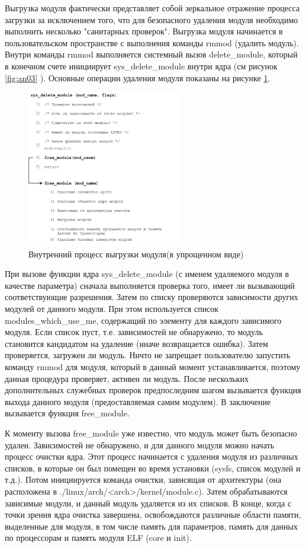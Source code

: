 Выгрузка модуля фактически представляет собой зеркальное отражение процесса загрузки за исключением того, что для безопасного удаления модуля необходимо выполнить несколько "санитарных проверок". Выгрузка модуля начинается в пользовательском пространстве с выполнения команды rmmod (удалить модуль). Внутри команды rmmod выполняется системный вызов delete\_module, который в конечном счете инициирует sys\_delete\_module внутри ядра (см рисунок \ref{fig:an03} ). Основные операции удаления модуля показаны на рисунке  \ref{fig:an05}.
\begin{figure}[h!]
	\centering
	\includegraphics[width=0.6\textwidth]{img/5.png}
	\caption{  Внутренний процесс выгрузки модуля(в упрощенном виде)}
	\label{fig:an05}
\end{figure}
При вызове функции ядра sys\_delete\_module (с именем удаляемого модуля в качестве параметра) сначала выполняется проверка того, имеет ли вызывающий соответствующие разрешения. Затем по списку проверяются зависимости других модулей от данного модуля. При этом используется список modules\_which\_use\_me, содержащий по элементу для каждого зависимого модуля. Если список пуст, т.е. зависимостей не обнаружено, то модуль становится кандидатом на удаление (иначе возвращается ошибка). Затем проверяется, загружен ли модуль. Ничто не запрещает пользователю запустить команду rmmod для модуля, который в данный момент устанавливается, поэтому данная процедура проверяет, активен ли модуль. После нескольких дополнительных служебных проверок предпоследним шагом вызывается функция выхода данного модуля (предоставляемая самим модулем). В заключение вызывается функция free\_module.

К моменту вызова free\_module уже известно, что модуль может быть безопасно удален. Зависимостей не обнаружено, и для данного модуля можно начать процесс очистки ядра. Этот процесс начинается с удаления модуля из различных списков, в которые он был помещен во время установки (sysfs, список модулей и т.д.). Потом инициируется команда очистки, зависящая от архитектуры (она расположена в ./linux/arch/<arch>/kernel/module.c). Затем обрабатываются зависимые модули, и данный модуль удаляется из их списков. В конце, когда с точки зрения ядра очистка завершена, освобождаются различные области памяти, выделенные для модуля, в том числе память для параметров, память для данных по процессорам и память модуля ELF (core и init).

